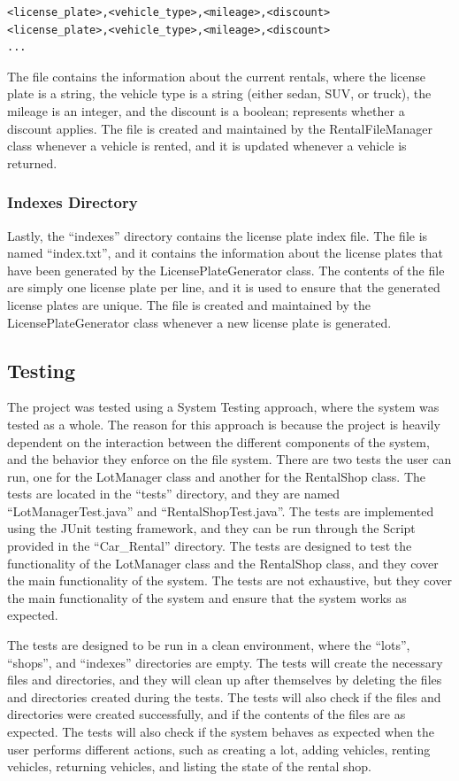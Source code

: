 \documentclass[conference]{IEEEtran}
\begin{document}
\begin{lstlisting}[style=input]
<license_plate>,<vehicle_type>,<mileage>,<discount> 
<license_plate>,<vehicle_type>,<mileage>,<discount>
... 
\end{lstlisting}

The file contains the information about the current rentals, where the license plate is a string, the vehicle type is a string (either sedan, SUV, or truck), the mileage is an integer, and the discount is a boolean; represents whether a discount applies. The file is created and maintained by the RentalFileManager class whenever a vehicle is rented, and it is updated whenever a vehicle is returned.

\subsubsection{Indexes Directory}
Lastly, the ``indexes'' directory contains the license plate index file. The file is named ``index.txt'', and it contains the information about the license plates that have been generated by the LicensePlateGenerator class. The contents of the file are simply one license plate per line, and it is used to ensure that the generated license plates are unique. The file is created and maintained by the LicensePlateGenerator class whenever a new license plate is generated.


\subsection{Testing}
The project was tested using a System Testing approach, where the system was tested as a whole. The reason for this approach is because the project is heavily dependent on the interaction between the different components of the system, and the behavior they enforce on the file system. There are two tests the user can run, one for the LotManager class and another for the RentalShop class. The tests are located in the ``tests'' directory, and they are named ``LotManagerTest.java'' and ``RentalShopTest.java''. The tests are implemented using the JUnit testing framework, and they can be run through the Script provided in the ``Car\_Rental'' directory. The tests are designed to test the functionality of the LotManager class and the RentalShop class, and they cover the main functionality of the system. The tests are not exhaustive, but they cover the main functionality of the system and ensure that the system works as expected.

The tests are designed to be run in a clean environment, where the ``lots'', ``shops'', and ``indexes'' directories are empty. The tests will create the necessary files and directories, and they will clean up after themselves by deleting the files and directories created during the tests. The tests will also check if the files and directories were created successfully, and if the contents of the files are as expected. The tests will also check if the system behaves as expected when the user performs different actions, such as creating a lot, adding vehicles, renting vehicles, returning vehicles, and listing the state of the rental shop.
\end{document}
